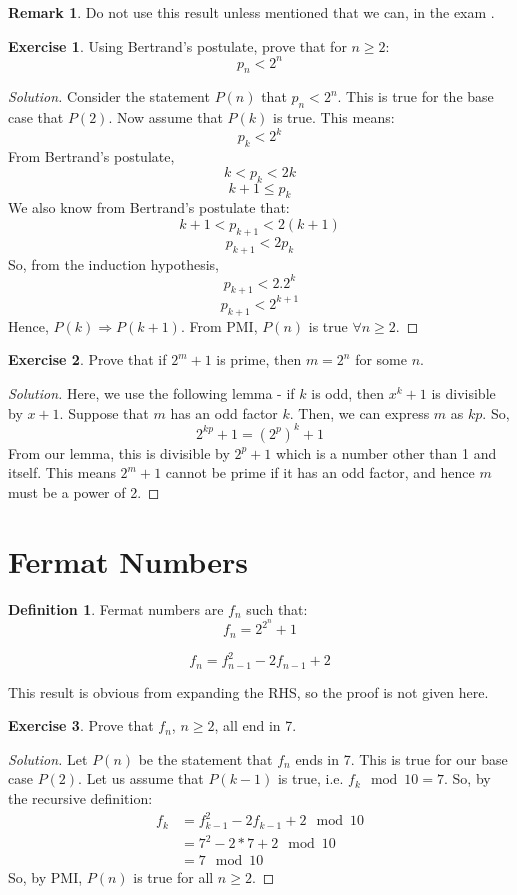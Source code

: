 \documentclass[12pt,letterpaper]{book}
\theoremstyle{definition}
\newtheorem{definition}{Definition} %
\newtheorem*{remark}{Remark}
\newtheorem*{exercise}{Exercise}
\newenvironment{solution}
  {\renewcommand\qedsymbol{$\blacksquare$}\begin{proof}[Solution]}
  {\end{proof}}
\begin{document}
\begin{remark}
  Do not use this result unless mentioned that we can, in the exam .
\end{remark}

\begin{exercise}
  Using Bertrand's postulate, prove that for $n \geq 2$:
  \[p_n < 2^n\]
\end{exercise}

\begin{solution}
  Consider the statement $P(n)$ that $p_n < 2^n$. This is true for the base case that $P(2)$. Now assume that $P(k)$ is true. This means:
  \[p_k < 2^k\]
  From Bertrand's postulate,
  \[k < p_k < 2k\]
  \[k+1 \leq p_k \]
  We also know from Bertrand's postulate that:
  \[k+1 < p_{k+1} < 2(k+1)\]
  \[p_{k+1} < 2p_k\]
  So, from the induction hypothesis,
  \[p_{k+1} < 2.2^k\]
  \[p_{k+1} < 2^{k+1}\]
  Hence, $P(k) \Rightarrow P(k+1)$. From PMI, $P(n)$ is true $\forall n \geq 2$.
\end{solution}
\begin{exercise}
  Prove that if $2^{m}+1$ is prime, then $m = 2^n$ for some $n$.
\end{exercise}
\begin{solution}
  Here, we use the following lemma - if $k$ is odd, then $x^k+1$ is divisible by $x+1$.
  Suppose that $m$ has an odd factor $k$. Then, we can express $m$ as $kp$. So,
  \[2^{kp}+1 = (2^{p})^k + 1\]
  From our lemma, this is divisible by $2^p+1$ which is a number other than 1 and itself. This means $2^m+1$ cannot be prime if it has an odd factor, and hence $m$ must be a power of 2.
\end{solution}

\section{Fermat Numbers}

\begin{definition}
  Fermat numbers are $f_n$ such that:
  \[f_n = 2^{2^n}+1\]
\end{definition}

\begin{lemma}
  \[f_n = f_{n-1}^2 - 2f_{n-1} + 2\]
\end{lemma}

This result is obvious from expanding the RHS, so the proof is not given here.

\begin{exercise}
  Prove that $f_n$, $n \geq 2$, all end in 7.
\end{exercise}
\begin{solution}
  Let $P(n)$ be the statement that $f_n$ ends in 7. This is true for our base case $P(2)$. Let us assume that $P(k-1)$ is true, i.e. $f_k \mod 10 = 7$. So, by the recursive definition:
  \begin{align*}
    f_k &= f_{k-1}^2 - 2f_{k-1} + 2 \mod 10 \\
        &= 7^2 - 2* 7 + 2 \mod 10 \\
        &= 7 \mod 10
  \end{align*}
  So, by PMI, $P(n)$ is true for all $n \geq 2$.
\end{solution}
\end{document}
